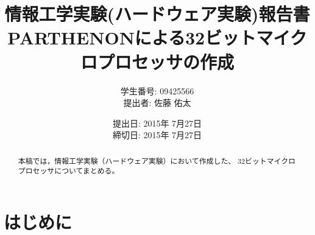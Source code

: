 \documentclass{jarticle}[11pt]
\title{{\normalsize 情報工学実験(ハードウェア実験)報告書}\\
PARTHENONによる32ビットマイクロプロセッサの作成 }
\author{ 
  学生番号: 09425566 \\
  提出者: 佐藤 佑太
}
\date{
  提出日: 2015年 7月27日 \\
  締切日: 2015年 7月27日
}
\begin{document}
\maketitle


\begin{abstract}

本稿では，情報工学実験（ハードウェア実験）において作成した、
32ビットマイクロプロセッサについてまとめる。
\end{abstract}


\section{はじめに}

% 

\noindent
\end{document}
